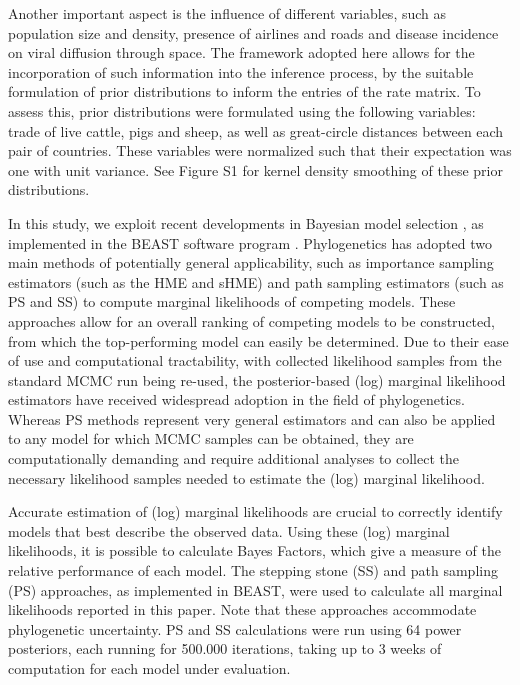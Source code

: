 \documentclass[10pt]{article}
\begin{document}
Another important aspect is the influence of different variables, such as population size and density, presence of airlines and roads and disease incidence on viral diffusion through space. 
The framework adopted here allows for the incorporation of such information into the inference process, by the suitable formulation of prior distributions to inform the entries of the rate matrix. 
To assess this, prior distributions were formulated using the following variables: trade of live cattle, pigs and sheep, as well as great-circle distances between each pair of countries. 
These variables were normalized such that their expectation was one with unit variance. See Figure S1 for kernel density smoothing of these prior distributions.

In this study, we exploit recent developments in Bayesian model selection \cite{Baele2012}, as implemented in the BEAST software program \cite{BEAST}.
Phylogenetics has adopted two main methods of potentially general applicability, such as importance sampling estimators (such as the HME and sHME) and path sampling estimators (such as PS and SS) to compute marginal likelihoods of competing models.
These approaches allow for an overall ranking of competing models to be constructed, from which the top-performing model can easily be determined.
Due to their ease of use and computational tractability, with collected likelihood samples from the standard MCMC run being re-used, the posterior-based (log) marginal likelihood estimators have received widespread adoption in the field of phylogenetics.
Whereas PS methods represent very general estimators and can also be applied to any model for which MCMC samples can be obtained, they are computationally demanding and require additional analyses to collect the necessary likelihood samples needed to estimate the (log) marginal likelihood.

Accurate estimation of (log) marginal likelihoods are crucial to correctly identify models that best describe the observed data. 
Using these (log) marginal likelihoods, it is possible to calculate Bayes Factors, which give a measure of the relative performance of each model. 
The stepping stone (SS) and path sampling (PS) approaches, as implemented in BEAST, were used  to calculate all marginal likelihoods reported in this paper.
Note that these approaches accommodate phylogenetic uncertainty.
PS and SS calculations were run using 64 power posteriors, each running for 500.000 iterations, taking up to 3 weeks of computation for each model under evaluation.
\end{document}
